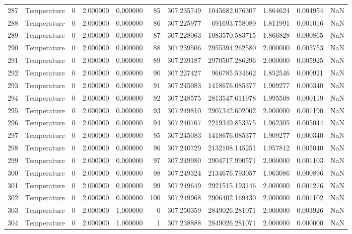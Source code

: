 \begin{tabular}{llrrrrrrrrr}
287 & Temperature & 0 & 2.000000 & 0.000000 & 85 & 307.235749 & 1045682.076307 & 1.864624 & 0.004954 & NaN \\
288 & Temperature & 0 & 2.000000 & 0.000000 & 86 & 307.225977 & 691693.758089 & 1.811991 & 0.001016 & NaN \\
289 & Temperature & 0 & 2.000000 & 0.000000 & 87 & 307.228063 & 1083570.583715 & 1.866828 & 0.000865 & NaN \\
290 & Temperature & 0 & 2.000000 & 0.000000 & 88 & 307.239506 & 2955394.262580 & 2.000000 & 0.005753 & NaN \\
291 & Temperature & 0 & 2.000000 & 0.000000 & 89 & 307.239187 & 2970507.286296 & 2.000000 & 0.005925 & NaN \\
292 & Temperature & 0 & 2.000000 & 0.000000 & 90 & 307.227427 & 966785.534662 & 1.852546 & 0.000921 & NaN \\
293 & Temperature & 0 & 2.000000 & 0.000000 & 91 & 307.245083 & 1418676.085377 & 1.909277 & 0.000340 & NaN \\
294 & Temperature & 0 & 2.000000 & 0.000000 & 92 & 307.248575 & 2813547.611978 & 1.995508 & 0.000119 & NaN \\
295 & Temperature & 0 & 2.000000 & 0.000000 & 93 & 307.249810 & 2907342.602002 & 2.000000 & 0.001190 & NaN \\
296 & Temperature & 0 & 2.000000 & 0.000000 & 94 & 307.240767 & 2219349.853375 & 1.962305 & 0.005044 & NaN \\
297 & Temperature & 0 & 2.000000 & 0.000000 & 95 & 307.245083 & 1418676.085377 & 1.909277 & 0.000340 & NaN \\
298 & Temperature & 0 & 2.000000 & 0.000000 & 96 & 307.240729 & 2132108.145251 & 1.957812 & 0.005040 & NaN \\
299 & Temperature & 0 & 2.000000 & 0.000000 & 97 & 307.249980 & 2904717.990571 & 2.000000 & 0.001103 & NaN \\
300 & Temperature & 0 & 2.000000 & 0.000000 & 98 & 307.249324 & 2134676.793057 & 1.963086 & 0.000896 & NaN \\
301 & Temperature & 0 & 2.000000 & 0.000000 & 99 & 307.249649 & 2921515.193146 & 2.000000 & 0.001276 & NaN \\
302 & Temperature & 0 & 2.000000 & 0.000000 & 100 & 307.249968 & 2906402.169430 & 2.000000 & 0.001102 & NaN \\
303 & Temperature & 0 & 2.000000 & 1.000000 & 0 & 307.250359 & 2849026.281071 & 2.000000 & 0.003926 & NaN \\
304 & Temperature & 0 & 2.000000 & 1.000000 & 1 & 307.238888 & 2849026.281071 & 2.000000 & 0.000000 & NaN \\

\end{tabular}
